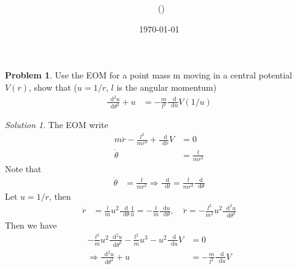 \documentclass[twoside,11pt]{article}
\title{{\lms \Code \ \Ass}}
\author{\lms \name \ (\href{mailto:\mail}{\mail})}
\date{\sffamily \today}
\makeatletter
\newcommand{\lms}{\fontfamily{lmss}\selectfont} %
\renewcommand*\d{\mathop{}\!\mathrm{d}}
\theoremstyle{definition}
\newtheorem{problem}{\lms Problem}
\theoremstyle{remark}
\newtheorem*{remark}{\lms Remark}
\newtheorem*{solution}{\lms Solution}
\renewcommand{\maketitle}{\bgroup\setlength{\parindent}{0pt}
\begin{flushleft}
  \textbf{\Large\@title}

  \@author
\end{flushleft}\egroup
}
\makeatother
\begin{document}
\maketitle
\thispagestyle{title}


\begin{problem}
Use the EOM for a point mass m moving in a central potential
$V (r)$, show that ($u = 1/r$, $l$ is the angular momentum)
\begin{align*}
    \frac{\d^2 u}{\d \theta^2} + u &= -\frac{m}{l^2}\frac{\d }{\d u} V(1/u)
\end{align*}
\end{problem}
\begin{solution}
The EOM write
\begin{align*}
    m\ddot r - \frac{l^2}{mr^3} + \frac{\d}{\d r} V &= 0\\
    \dot{\theta} &= \frac{l}{mr^2}
\end{align*}
Note that
\begin{align*}
    \dot\theta &= 
    \frac{l}{mr^2} \Rightarrow
    \frac{\d}{\d t} = 
    \frac{l}{mr^2}\frac{\d}{\d\theta}
\end{align*}
Let $u=1/r$, then
\begin{align*}
    \dot r &= \frac{l}{m}u^2\frac{\d}{\d\theta}\frac{1}{u} = -\frac{l}{m}\frac{\d u}{\d \theta},\quad
    \ddot r = -\frac{l^2}{m^2} u^2\frac{\d^2 u }{\d\theta^2}
\end{align*}
Then we have
\begin{align*}
    -\frac{l^2}{m}u^2\frac{\d^2 u}{\d\theta^2} - \frac{l^2}{m}u^3 - u^2\frac{\d}{\d u}V &= 0\\
    \Rightarrow
    \frac{\d^2 u}{\d \theta^2} + u &= -\frac{m}{l^2}\frac{\d }{\d u} V
\end{align*}
\end{solution}
\end{document}
